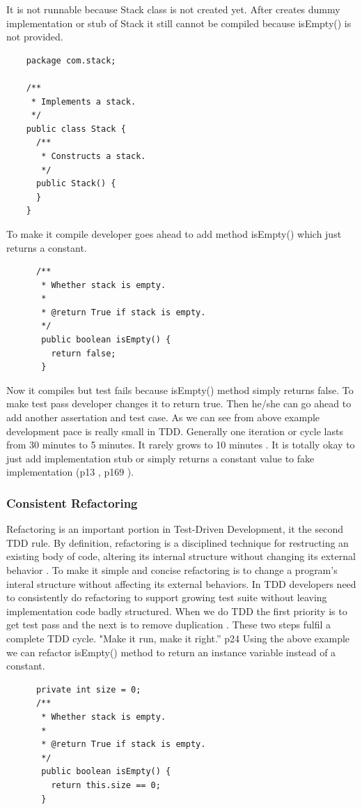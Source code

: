 It is not runnable because Stack class is not created yet. After creates
dummy implementation or stub of Stack it still cannot be compiled because
isEmpty() is not provided.

    \begin{verbatim}
    package com.stack;

    /**
     * Implements a stack.
     */
    public class Stack {
      /**
       * Constructs a stack.
       */
      public Stack() {
      }
    }
    \end{verbatim}

To make it compile developer goes ahead to add method isEmpty() which just
returns a constant.
    \begin{verbatim}
      /**
       * Whether stack is empty.
       * 
       * @return True if stack is empty.
       */
       public boolean isEmpty() {
         return false;
       }
    \end{verbatim}

Now it compiles but test fails because isEmpty() method simply returns
false. To make test pass developer changes it to return true. Then he/she
can go ahead to add another assertation and test case. As we can see from
above example development pace is really small in TDD. Generally one
iteration or cycle lasts from 30 minutes to 5 minutes. It rarely grows to
10 minutes \cite{GaryPollice:03}. It is totally okay to just add
implementation stub or simply returns a constant value to fake 
implementation (p13 \cite{Beck:03}, p169 \cite{Astels:03}).

\subsubsection{Consistent Refactoring}
Refactoring is an important portion in Test-Driven Development, it the
second TDD rule. By definition, refactoring is a disciplined technique for
restructing an existing body of code, altering its internal structure
without changing its external behavior \cite{Refactoring}. To make it
simple and concise refactoring is to change a program's interal structure
without affecting its external behaviors. In TDD developers need to
consistently do refactoring to support growing test suite without leaving
implementation code badly structured. When we do TDD the first priority is
to get test pass and the next is to remove duplication \cite{Beck:03}.
These two steps fulfil a complete TDD cycle. "Make it run, make it right.''
p24 \cite{Beck:03} Using the above example we can refactor isEmpty()
method to return an instance variable instead of a constant.
    \begin{verbatim}
      private int size = 0;
      /**
       * Whether stack is empty.
       * 
       * @return True if stack is empty.
       */
       public boolean isEmpty() {
         return this.size == 0;
       }
    \end{verbatim}

